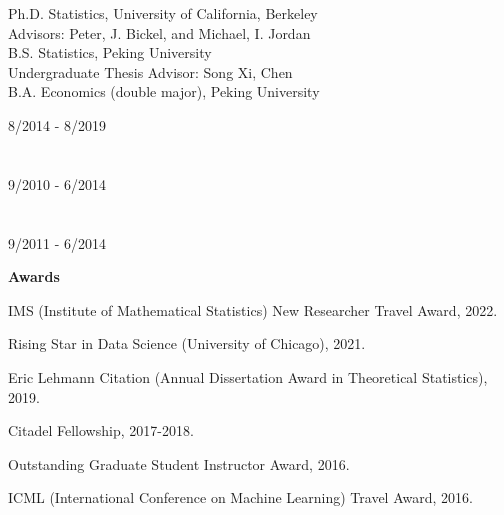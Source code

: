 \documentclass{article}
\begin{document}
\begin{minipage}{0.65\linewidth}
\noindent Ph.D. Statistics, University of California, Berkeley\\
Advisors: Peter, J. Bickel, and Michael, I. Jordan\\

\noindent B.S. Statistics, Peking University\\
Undergraduate Thesis Advisor: Song Xi, Chen\\

\noindent B.A. Economics (double major), Peking University

\end{minipage}\hfill
\begin{minipage}{0.34\linewidth}
\flushright
\vspace{-1mm}
8/2014 - 8/2019 \\
~\\
~\\
9/2010 - 6/2014\\
~\\
~\\
9/2011 - 6/2014\\
\end{minipage}

\vspace{5mm}
\begin{large}
\noindent \textbf{Awards}
\end{large}

\vspace{5mm}

IMS (Institute of Mathematical Statistics) New Researcher Travel Award, 2022.

\vspace{2mm}

Rising Star in Data Science (University of Chicago), 2021.

\vspace{2mm}

Eric Lehmann Citation (Annual Dissertation Award in Theoretical Statistics), 2019.

\vspace{2mm}

Citadel Fellowship, 2017-2018.

\vspace{2mm}

Outstanding Graduate Student Instructor Award, 2016.

\vspace{2mm}
ICML (International Conference on Machine Learning) Travel Award, 2016.
\end{document}
